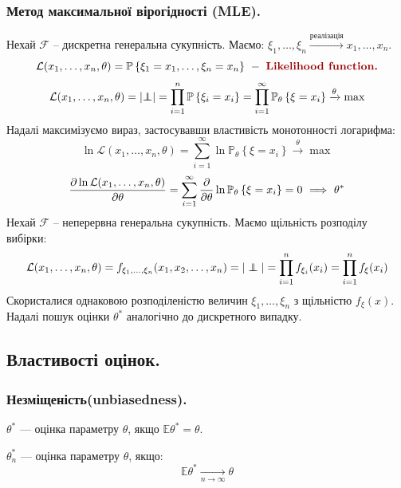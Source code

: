 \subsubsection{Метод максимальної вірогідності (MLE).}
\vspace*{-1em}
Нехай $\mathcal{F}$ -- дискретна генеральна сукупність. Маємо:
$
\xi_1 , \dots , \xi_n \xrightarrow{\text{реалізація}} x_1 , \dots , x_n
$.
$$
\mathcal{L} (x_1, \dots, x_n, \theta) = \mathbb{P} \left\lbrace \xi_1 = x_1 , \dots , \xi_n = x_n \right\rbrace \  - \  \red{ Likelihood function.}
$$
\vspace*{-1em}
$$
\mathcal{L} (x_1, \dots, x_n, \theta)  = \left| \independent \right| =  \prod\limits_{i = 1}^{n}{ \mathbb{P} \left\lbrace \xi_i = x_i \right\rbrace} =
 \prod\limits_{i = 1}^{ \infty}{\mathbb{P}_{\theta} \left\lbrace \xi= x_i \right\rbrace} \xrightarrow{\theta} \max
$$
Надалі максимізуємо вираз, застосувавши властивість монотонності логарифма:
\vspace*{-0.5em}
$$
\ln \mathcal{L} (x_1, \dots, x_n, \theta)   =  \sum\limits_{i = 1}^{ \infty} { \ln \mathbb{P}_{\theta} \left\lbrace \xi= x_i \right\rbrace} \xrightarrow{\theta} \max
$$
\vspace*{-0.5em}
$$
\frac{ \d \ln \mathcal{L} (x_1, \dots, x_n, \theta)}{\d \theta}    =
 \sum\limits_{i = 1}^{ \infty} { \frac{\d }{\d \theta}  \ln \mathbb{P}_{\theta} \left\lbrace \xi= x_i \right\rbrace} =  0 \ \Longrightarrow \  \theta^*
$$
Нехай $\mathcal{F}$ -- неперервна генеральна сукупність. Маємо щільність розподілу вибірки:
\vspace*{-0.5em}
$$
\mathcal{L} (x_1, \dots, x_n , \theta) = f_{\xi_1 , \dots , \xi_n }(x_1, x_2 , \dots, x_n) = |\independent| =  \prod\limits_{i = 1}^{n}{ f_{\xi_i} (x_i)} = \prod\limits_{i = 1}^{n}{ f_{\xi} (x_i)}
$$
Скористалися однаковою розподіленістю величин $\xi_1 , \dots , \xi_n$ з щільністю $f_{\xi} (x)$.\\ Надалі пошук оцінки $\theta^*$ аналогічно до дискретного випадку.
\subsection{Властивості оцінок.}
\subsubsection{Незміщеність(unbiasedness).}
\begin{defo}$\theta^*$ ---  оцінка параметру $\theta$, якщо $\mathbb{E} \theta^* = \theta$.
\end{defo}
\begin{defo}$\theta^*_n$ ---  оцінка параметру $\theta$, якщо:
$$\mathbb{E} \theta^* \xrightarrow[n\to\infty]{} \theta$$
\end{defo}
